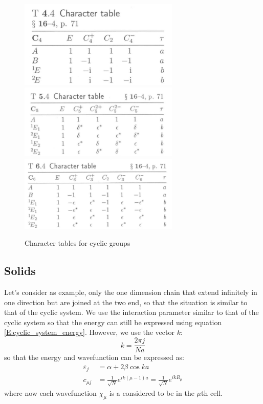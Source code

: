 \documentclass{article}
\begin{document}
\begin{figure}[h!]
    \centering
    \includegraphics[width=3in]{figures/F_C4.png}
    \includegraphics[width=3in]{figures/F_C5.png}
    \includegraphics[width=3in]{figures/F_C6.png}
    \caption{Character tables for cyclic groups}
    \label{F_cyclic_group_table}
\end{figure}

\subsection{Solids}
Let's consider as example, only the one dimension chain that extend infinitely in one direction but are joined 
at the two end, so that the situation is similar to that of the cyclic system. 
We use the interaction parameter similar to that of the cyclic system so that the energy can still be 
expressed using equation \eqref{E:cyclic_system_energy}. However, we use the vector $k$:
\begin{equation}
    k = \frac{2\pi j}{Na}
\end{equation}
so that the energy and wavefunction can be expressed as:
\begin{align}
    \varepsilon_j &= \alpha + 2 \beta \cos ka \\ 
    c_{\mu j} &= \frac{1}{\sqrt{N}} e^{ik(\mu-1) a} = \frac{1}{\sqrt{N}} e^{ikR_{\mu}}
\end{align}
where now each wavefunction $\chi_{\mu}$ is a considered to be in the $\mu$th cell. 
\end{document}

